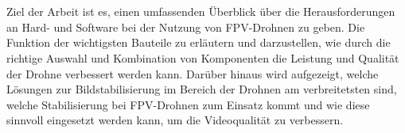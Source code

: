     \\ \\
    Ziel der Arbeit ist es, einen umfassenden Überblick über die Herausforderungen an Hard- und Software bei der Nutzung von FPV-Drohnen zu geben. Die Funktion der wichtigsten Bauteile zu erläutern und darzustellen, wie durch die richtige Auswahl und Kombination von Komponenten die Leistung und Qualität der Drohne verbessert werden kann. Darüber hinaus wird aufgezeigt, welche Lösungen zur Bildstabilisierung im Bereich der Drohnen am verbreitetsten sind, welche Stabilisierung bei FPV-Drohnen zum Einsatz kommt und wie diese sinnvoll eingesetzt werden kann, um die Videoqualität zu verbessern.